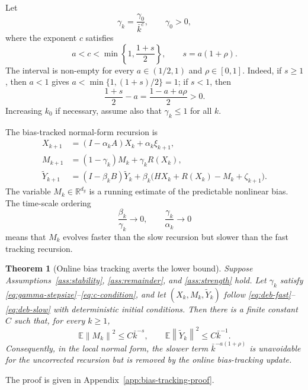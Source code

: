 \documentclass{article}
\newtheorem{theorem}{Theorem}[section]
\newcommand{\R}{\mathbb{R}}
\newcommand{\E}{\mathbb{E}}
\newcommand{\norm}[1]{\left\lVert #1\right\rVert}
\begin{document}
Let
\begin{equation}
  \gamma_k=\frac{\gamma_0}{\bar k^c},
  \qquad \gamma_0>0, \label{eq:gamma-stepsize}
\end{equation}
where the exponent $c$ satisfies
\begin{equation}
  a<c<\min\left\{1,\frac{1+s}{2}\right\},
  \qquad s=a(1+\rho). \label{eq:c-condition}
\end{equation}
The interval is non-empty for every $a\in(1/2,1)$ and $\rho\in[0,1]$. Indeed, if $s\ge1$, then $a<1$ gives $a<\min\{1,(1+s)/2\}=1$; if $s<1$, then
\[
  \frac{1+s}{2}-a
  =\frac{1-a+a\rho}{2}>0.
\]
Increasing $k_0$ if necessary, assume also that $\gamma_k\le1$ for all $k$.

The bias-tracked normal-form recursion is
\begin{align}
  X_{k+1} &= (I-\alpha_k A)X_k+\alpha_k\xi_{k+1}, \label{eq:deb-fast}\\
  M_{k+1} &= (1-\gamma_k)M_k+\gamma_k R(X_k), \label{eq:bias-tracker}\\
  \widetilde Y_{k+1}
  &= (I-\beta_k B)\widetilde Y_k
     +\beta_k\big(HX_k+R(X_k)-M_k+\zeta_{k+1}\big). \label{eq:deb-slow}
\end{align}
The variable $M_k\in\R^{d_y}$ is a running estimate of the predictable nonlinear bias. The time-scale ordering
\[
  \frac{\beta_k}{\gamma_k}\to0,
  \qquad
  \frac{\gamma_k}{\alpha_k}\to0
\]
means that $M_k$ evolves faster than the slow recursion but slower than the fast tracking recursion.

\begin{theorem}[Online bias tracking averts the lower bound]
\label{thm:bias-tracking}
Suppose Assumptions~\ref{ass:stability}, \ref{ass:remainder}, and \ref{ass:strength} hold. Let $\gamma_k$ satisfy \eqref{eq:gamma-stepsize}--\eqref{eq:c-condition}, and let $(X_k,M_k,\widetilde Y_k)$ follow \eqref{eq:deb-fast}--\eqref{eq:deb-slow} with deterministic initial conditions. Then there is a finite constant $C$ such that, for every $k\ge1$,
\begin{equation}
  \E\norm{M_k}^2\le C\bar k^{-s},
  \qquad
  \E\norm{\widetilde Y_k}^2\le C\bar k^{-1}. \label{eq:bias-tracking-rate}
\end{equation}
Consequently, in the local normal form, the slower term $\bar k^{-a(1+\rho)}$ is unavoidable for the uncorrected recursion but is removed by the online bias-tracking update.
\end{theorem}

The proof is given in Appendix~\ref{app:bias-tracking-proof}.
\end{document}

